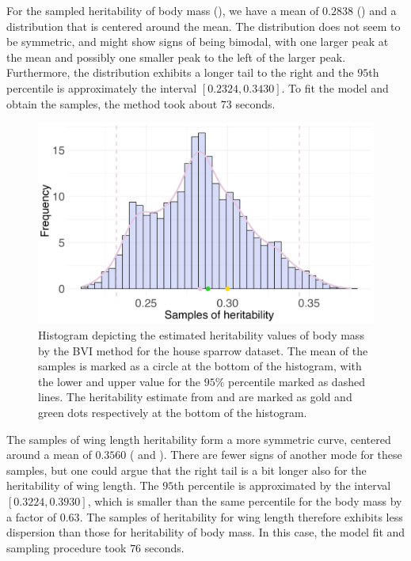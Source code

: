 \noindent For the sampled heritability of body mass (), we have a mean of $0.2838$ () and a distribution that is centered around the mean. The distribution does not seem to be symmetric, and might show signs of being bimodal, with one larger peak at the mean and possibly one smaller peak to the left of the larger peak. Furthermore, the distribution exhibits a longer tail to the right and the $95$th percentile is approximately the interval $[0.2324, 0.3430]$. To fit the model and obtain the samples, the method took about $73$ seconds.
\begin{figure}[H]
  \centering
    \includegraphics[width=1\linewidth]{Figures/House sparrow study/Heritability_mass.png}
    \caption[Estimated heritability of body mass]{Histogram depicting the estimated heritability values of body mass by the BVI method for the house sparrow dataset. The mean of the samples is marked as a circle at the bottom of the histogram, with the lower and upper value for the $95\%$ percentile marked as dashed lines. The heritability estimate from \citet{Silva2017} and \citet{Muff2019Genetic} are marked as gold and green dots respectively at the bottom of the histogram.}
    \label{fig:heritability_mass}
\end{figure}
\noindent The samples of wing length heritability form a more symmetric curve, centered around a mean of $0.3560$ ( and ). There are fewer signs of another mode for these samples, but one could argue that the right tail is a bit longer also for the heritability of wing length. The $95$th percentile is approximated by the interval $[0.3224, 0.3930]$, which is smaller than the same percentile for the body mass by a factor of $0.63$. The samples of heritability for wing length therefore exhibits less dispersion than those for heritability of body mass. In this case, the model fit and sampling procedure took $76$ seconds.
